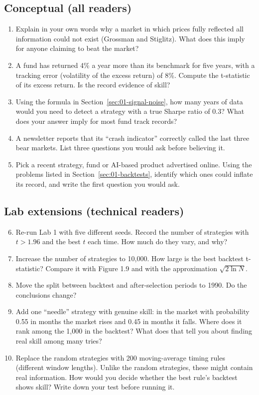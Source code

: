 \subsection*{Conceptual (all readers)}

\begin{enumerate}
  \item Explain in your own words why a market in which prices fully reflected all information could not exist (Grossman and Stiglitz). What does this imply for anyone claiming to beat the market?
  \item A fund has returned 4\% a year more than its benchmark for five years, with a tracking error (volatility of the excess return) of 8\%. Compute the t-statistic of its excess return. Is the record evidence of skill?
  \item Using the formula in Section~\ref{sec:01-signal-noise}, how many years of data would you need to detect a strategy with a true Sharpe ratio of 0.3? What does your answer imply for most fund track records?
  \item A newsletter reports that its ``crash indicator'' correctly called the last three bear markets. List three questions you would ask before believing it.
  \item Pick a recent strategy, fund or AI-based product advertised online. Using the problems listed in Section~\ref{sec:01-backtests}, identify which ones could inflate its record, and write the first question you would ask.
\end{enumerate}

\subsection*{Lab extensions (technical readers)}

\begin{enumerate}
  \setcounter{enumi}{5}
  \item Re-run Lab 1 with five different seeds. Record the number of strategies with $t > 1.96$ and the best $t$ each time. How much do they vary, and why?
  \item Increase the number of strategies to 10,000. How large is the best backtest t-statistic? Compare it with Figure 1.9 and with the approximation $\sqrt{2 \ln N}$.
  \item Move the split between backtest and after-selection periods to 1990. Do the conclusions change?
  \item Add one ``needle'' strategy with genuine skill: in the market with probability 0.55 in months the market rises and 0.45 in months it falls. Where does it rank among the 1,000 in the backtest? What does that tell you about finding real skill among many tries?
  \item Replace the random strategies with 200 moving-average timing rules (different window lengths). Unlike the random strategies, these might contain real information. How would you decide whether the best rule's backtest shows skill? Write down your test before running it.
\end{enumerate}
